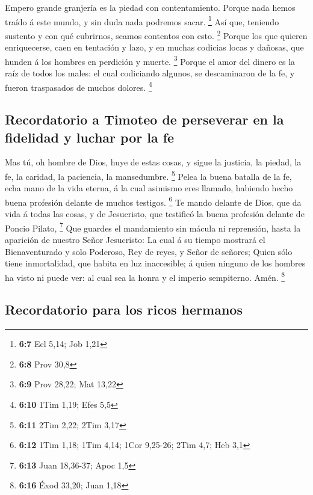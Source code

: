  Empero grande granjería es la piedad con contentamiento.
 Porque nada hemos traído á este mundo, y sin duda nada
podremos sacar. \footnote{\textbf{6:7} Ecl 5,14; Job 1,21} 
Así que, teniendo sustento y con qué cubrirnos, seamos contentos con
esto. \footnote{\textbf{6:8} Prov 30,8}  Porque los que
quieren enriquecerse, caen en tentación y lazo, y en muchas codicias
locas y dañosas, que hunden á los hombres en perdición y muerte.
\footnote{\textbf{6:9} Prov 28,22; Mat 13,22}  Porque el
amor del dinero es la raíz de todos los males: el cual codiciando
algunos, se descaminaron de la fe, y fueron traspasados de muchos
dolores. \footnote{\textbf{6:10} 1Tim 1,19; Efes 5,5}

\hypertarget{recordatorio-a-timoteo-de-perseverar-en-la-fidelidad-y-luchar-por-la-fe}{%
\subsection{Recordatorio a Timoteo de perseverar en la fidelidad y
luchar por la
fe}\label{recordatorio-a-timoteo-de-perseverar-en-la-fidelidad-y-luchar-por-la-fe}}

 Mas tú, oh hombre de Dios, huye de estas cosas, y sigue la
justicia, la piedad, la fe, la caridad, la paciencia, la mansedumbre.
\footnote{\textbf{6:11} 2Tim 2,22; 2Tim 3,17}  Pelea la
buena batalla de la fe, echa mano de la vida eterna, á la cual asimismo
eres llamado, habiendo hecho buena profesión delante de muchos testigos.
\footnote{\textbf{6:12} 1Tim 1,18; 1Tim 4,14; 1Cor 9,25-26; 2Tim 4,7;
  Heb 3,1}  Te mando delante de Dios, que da vida á todas
las cosas, y de Jesucristo, que testificó la buena profesión delante de
Poncio Pilato, \footnote{\textbf{6:13} Juan 18,36-37; Apoc 1,5}
 Que guardes el mandamiento sin mácula ni reprensión, hasta
la aparición de nuestro Señor Jesucristo:  La cual á su
tiempo mostrará el Bienaventurado y solo Poderoso, Rey de reyes, y Señor
de señores;  Quien sólo tiene inmortalidad, que habita en
luz inaccesible; á quien ninguno de los hombres ha visto ni puede ver:
al cual sea la honra y el imperio sempiterno. Amén. \footnote{\textbf{6:16}
  Éxod 33,20; Juan 1,18}

\hypertarget{recordatorio-para-los-ricos-hermanos}{%
\subsection{Recordatorio para los ricos
hermanos}\label{recordatorio-para-los-ricos-hermanos}}


